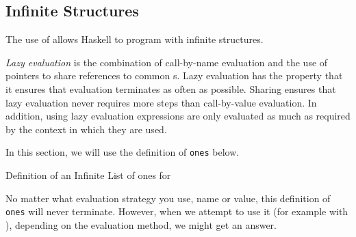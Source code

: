 \subsection{Infinite Structures}\label{subsec:Infinite_Structures}
The use of  allows Haskell to program with infinite structures.

\begin{definition}\label{def:Lazy_Evaluation}
  \emph{Lazy evaluation} is the combination of call-by-name evaluation and the use of pointers to share references to common s.
  Lazy evaluation has the property that it ensures that evaluation terminates as often as possible.
  Sharing ensures that lazy evaluation never requires more steps than call-by-value evaluation.
  In addition, using lazy evaluation expressions are only evaluated as much as required by the context in which they are used.
\end{definition}

In this section, we will use the definition of \texttt{ones} below.
\begin{listing}[h!tbp]
\caption{Definition of an Infinite List of ones for }
\label{lst:Ones_Definition}
\end{listing}

No matter what evaluation strategy you use, name or value, this definition of \texttt{ones} will never terminate.
However, when we attempt to use it (for example with ), depending on the evaluation method, we might get an answer.


